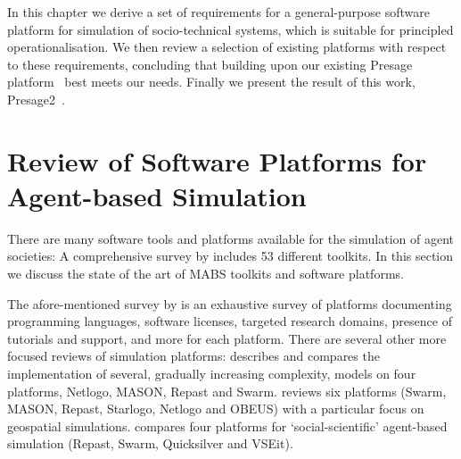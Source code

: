In this chapter we derive a set of requirements for a general-purpose software platform for simulation of socio-technical systems, which is suitable for principled operationalisation. We then review a selection of existing platforms with respect to these requirements, concluding that building upon our existing Presage platform~\citep{Neville:2009,Pitt2011} best meets our needs. Finally we present the result of this work, Presage2~\citep{Macbeth2014}. %

%

\section{Review of Software Platforms for Agent-based Simulation}

There are many software tools and platforms available for the simulation of agent societies: A comprehensive survey by \citet{CynthiaNikolaiandGregoryMadey2009} includes 53 different toolkits. In this section we discuss the state of the art of \ac{MABS} toolkits and software platforms.

The afore-mentioned survey by \citet{CynthiaNikolaiandGregoryMadey2009} is an exhaustive survey of platforms documenting programming languages, software licenses, targeted research domains, presence of tutorials and support, and more for each platform. There are several other more focused reviews of simulation platforms: \citet{Railsback2006} describes and compares the implementation of several, gradually increasing complexity, models on four platforms, Netlogo, MASON, Repast and Swarm. \citet{Castle2006} reviews six platforms (Swarm, MASON, Repast, Starlogo, Netlogo and OBEUS) with a particular focus on geospatial simulations. \citet{Tobias2004} compares four platforms for `social-scientific' agent-based simulation (Repast, Swarm, Quicksilver and VSEit).

